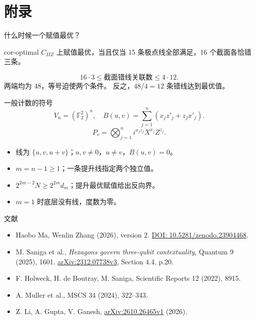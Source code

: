 \documentclass{beamer}
\begin{document}
\section{附录}
\begin{frame}{什么时候一个赋值最优？}
\begin{bookresult}{cor-optimal}
$C_{IIZ}$ 上赋值最优，当且仅当 15 条极点线全部满足，16 个截面各恰错三条。
\end{bookresult}
\[16\cdot3\le\text{截面错线关联数}\le4\cdot12.\]
两端均为 48，等号迫使两个条件。
反之，$48/4=12$ 条错线达到最优值。
\end{frame}
\begin{frame}{一般计数的符号}
\[
V_n=(\mathbb F_2^2)^n,\quad B(u,v)=\sum_{j=1}^{n}(x_jz'_j+z_jx'_j).
\]
\[P_v=\bigotimes_{j=1}^{n}i^{x_jz_j}X^{x_j}Z^{z_j}.\]
\begin{itemize}
\item 线为 $\{u,v,u+v\}$；$u,v\ne0$，$u\ne v$，$B(u,v)=0$。
\item $m=n-1\ge1$；一条提升线指定两个独立值。
\item $2^{2m-2}N\ge2^{2m}d_m$；提升最优赋值给出反向界。
\item $m=1$ 时底层没有线，度数为零。
\end{itemize}
\end{frame}
\begin{frame}{文献}
\small
\begin{itemize}
\item Haobo Ma, Wenlin Zhang (2026), version 2.\newline
\href{https://doi.org/10.5281/zenodo.23904468}{DOI: 10.5281/zenodo.23904468}.
\item M. Saniga et al., \emph{Hexagons govern three-qubit contextuality}, Quantum 9 (2025), 1601.\newline
\href{https://arxiv.org/abs/2312.07738v3}{arXiv:2312.07738v3}, Section 4.4, p.20.
\item F. Holweck, H. de Boutray, M. Saniga, Scientific Reports 12 (2022), 8915.
\item A. Muller et al., MSCS 34 (2024), 322--343.
\item Z. Li, A. Gupta, V. Ganesh, \href{https://arxiv.org/abs/2610.26465v1}{arXiv:2610.26465v1} (2026).
\end{itemize}
\end{frame}
\FormalVerification
\end{document}
